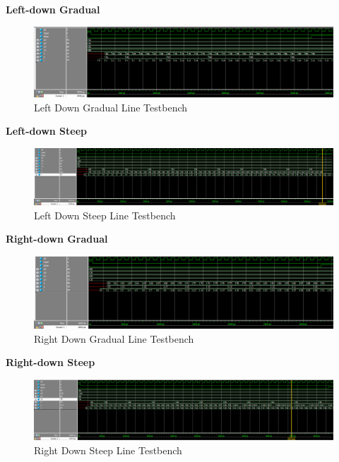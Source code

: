 \documentclass[11pt, titlepage]{article}
\begin{document}
\begin{description}
                \newpage
                \item \textbf{Left-down Gradual} \\
                    \begin{figure}[H]
                        \centering
                        \includegraphics[scale = 0.6]{Images/left-down gradual line testbench.png}
                        \caption{Left Down Gradual Line Testbench}
                    \end{figure}
                \item \textbf{Left-down Steep} \\
                    \begin{figure}[H]
                        \centering
                        \includegraphics[scale = 0.5]{Images/left-down steep line testbench.png}
                        \caption{Left Down Steep Line Testbench}
                    \end{figure}
                \item \textbf{Right-down Gradual} \\
                    \begin{figure}[H]
                        \centering
                        \includegraphics[scale = 0.6]{Images/right-down gradual line testbench.png}
                        \caption{Right Down Gradual Line Testbench}
                    \end{figure}
                \newpage
                \item \textbf{Right-down Steep} \\
                    \begin{figure}[H]
                        \centering
                        \includegraphics[scale = 0.5]{Images/right-down steep line testbench.png}
                        \caption{Right Down Steep Line Testbench}
                    \end{figure}
            \end{description}
\end{document}
